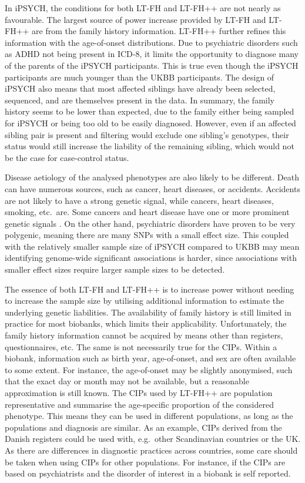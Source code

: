 In iPSYCH, the conditions for both LT-FH and LT-FH++ are not nearly as favourable. The largest source of power increase provided by LT-FH and LT-FH++ are from the family history information. LT-FH++ further refines this information with the age-of-onset distributions. Due to psychiatric disorders such as ADHD not being present in ICD-8, it limits the opportunity to diagnose many of the parents of the iPSYCH participants. This is true even though the iPSYCH participants are much younger than the UKBB participants. The design of iPSYCH also means that most affected siblings have already been selected, sequenced, and are themselves present in the data\cite{pedersen2018ipsych2012}. In summary, the family history seems to be lower than expected, due to the family either being sampled for iPSYCH or being too old to be easily diagnosed. However, even if an affected sibling pair is present and filtering would exclude one sibling's genotypes, their status would still increase the liability of the remaining sibling, which would not be the case for case-control status.

Disease aetiology of the analysed phenotypes are also likely to be different. Death can have numerous sources, such as cancer, heart diseases, or accidents. Accidents are not likely to have a strong genetic signal, while cancers, heart diseases, smoking, etc.\ are. Some cancers and heart disease have one or more prominent genetic signals \cite{koyama2020population,marioni2018gwas}. On the other hand, psychiatric disorders have proven to be very polygenic, meaning there are many SNPs with a small effect size\cite{gandal2018shared}. This coupled with the relatively smaller sample size of iPSYCH compared to UKBB may mean identifying genome-wide significant associations is harder, since associations with smaller effect sizes require larger sample sizes to be detected.

The essence of both LT-FH and LT-FH++ is to increase power without needing to increase the sample size by utilising additional information to estimate the underlying genetic liabilities. The availability of family history is still limited in practice for most biobanks, which limits their applicability. Unfortunately, the family history information cannot be acquired by means other than registers, questionnaires, etc. The same is not necessarily true for the CIPs. Within a biobank, information such as birth year, age-of-onset, and sex are often available to some extent. For instance, the age-of-onset may be slightly anonymised, such that the exact day or month may not be available, but a reasonable approximation is still known. The CIPs used by LT-FH++ are population representative and summarise the age-specific proportion of the considered phenotype. This means they can be used in different populations, as long as the populations and diagnosis are similar. As an example, CIPs derived from the Danish registers could be used with, e.g.\ other Scandinavian countries or the UK. As there are differences in diagnostic practices across countries, some care should be taken when using CIPs for other populations. For instance, if the CIPs are based on psychiatrists and the disorder of interest in a biobank is self reported.